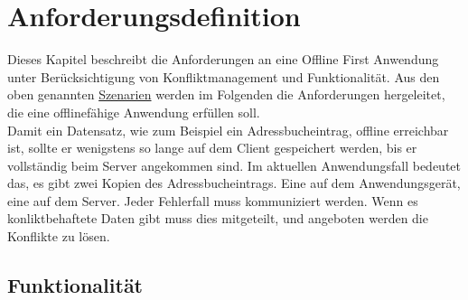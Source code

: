 \chapter{\label{chap:anforderungen}Anforderungsdefinition}
Dieses Kapitel beschreibt die Anforderungen an eine Offline First Anwendung unter Berücksichtigung von Konfliktmanagement und Funktionalität. 
Aus den oben genannten \hyperref[chap:szenarien]{Szenarien} werden im Folgenden die Anforderungen hergeleitet, die eine offlinefähige Anwendung erfüllen soll.\\
Damit ein Datensatz, wie zum Beispiel ein Adressbucheintrag, offline erreichbar ist, sollte er wenigstens so lange auf dem Client gespeichert werden, bis er vollständig beim Server angekommen sind. Im aktuellen Anwendungsfall bedeutet das, es gibt zwei Kopien des Adressbucheintrags. Eine auf dem Anwendungsgerät, eine auf dem Server. Jeder Fehlerfall muss kommuniziert werden. Wenn es konliktbehaftete Daten gibt muss dies mitgeteilt, und angeboten werden die Konflikte zu lösen.
%
%

%
%
\section{Funktionalität}


